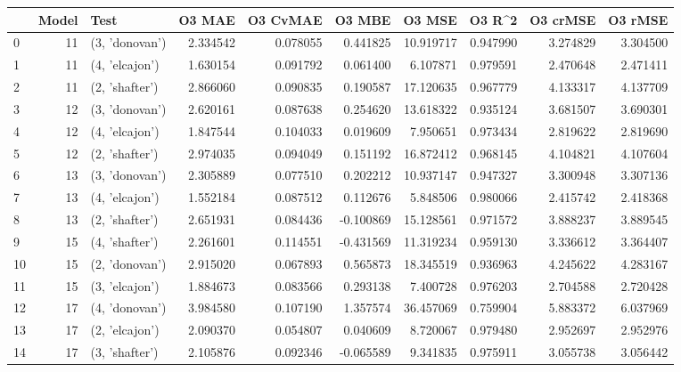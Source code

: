 \begin{tabular}{lrlrrrrrrr}
\toprule
{} &  Model &            Test &    O3 MAE &  O3 CvMAE &    O3 MBE &     O3 MSE &    O3 R\textasciicircum2 &  O3 crMSE &   O3 rMSE \\
\midrule
0  &     11 &  (3, 'donovan') &  2.334542 &  0.078055 &  0.441825 &  10.919717 &  0.947990 &  3.274829 &  3.304500 \\
1  &     11 &  (4, 'elcajon') &  1.630154 &  0.091792 &  0.061400 &   6.107871 &  0.979591 &  2.470648 &  2.471411 \\
2  &     11 &  (2, 'shafter') &  2.866060 &  0.090835 &  0.190587 &  17.120635 &  0.967779 &  4.133317 &  4.137709 \\
3  &     12 &  (3, 'donovan') &  2.620161 &  0.087638 &  0.254620 &  13.618322 &  0.935124 &  3.681507 &  3.690301 \\
4  &     12 &  (4, 'elcajon') &  1.847544 &  0.104033 &  0.019609 &   7.950651 &  0.973434 &  2.819622 &  2.819690 \\
5  &     12 &  (2, 'shafter') &  2.974035 &  0.094049 &  0.151192 &  16.872412 &  0.968145 &  4.104821 &  4.107604 \\
6  &     13 &  (3, 'donovan') &  2.305889 &  0.077510 &  0.202212 &  10.937147 &  0.947327 &  3.300948 &  3.307136 \\
7  &     13 &  (4, 'elcajon') &  1.552184 &  0.087512 &  0.112676 &   5.848506 &  0.980066 &  2.415742 &  2.418368 \\
8  &     13 &  (2, 'shafter') &  2.651931 &  0.084436 & -0.100869 &  15.128561 &  0.971572 &  3.888237 &  3.889545 \\
9  &     15 &  (4, 'shafter') &  2.261601 &  0.114551 & -0.431569 &  11.319234 &  0.959130 &  3.336612 &  3.364407 \\
10 &     15 &  (2, 'donovan') &  2.915020 &  0.067893 &  0.565873 &  18.345519 &  0.936963 &  4.245622 &  4.283167 \\
11 &     15 &  (3, 'elcajon') &  1.884673 &  0.083566 &  0.293138 &   7.400728 &  0.976203 &  2.704588 &  2.720428 \\
12 &     17 &  (4, 'donovan') &  3.984580 &  0.107190 &  1.357574 &  36.457069 &  0.759904 &  5.883372 &  6.037969 \\
13 &     17 &  (2, 'elcajon') &  2.090370 &  0.054807 &  0.040609 &   8.720067 &  0.979480 &  2.952697 &  2.952976 \\
14 &     17 &  (3, 'shafter') &  2.105876 &  0.092346 & -0.065589 &   9.341835 &  0.975911 &  3.055738 &  3.056442 \\

\end{tabular}
